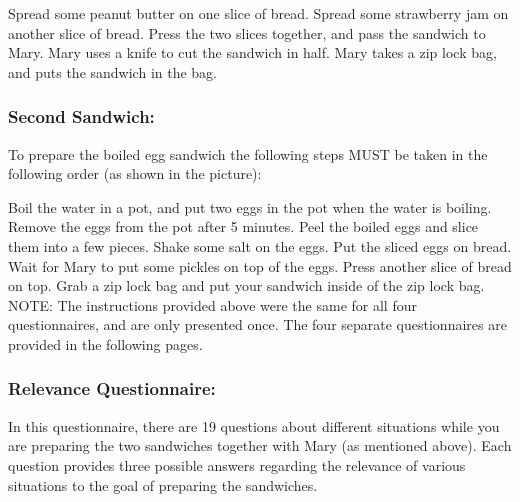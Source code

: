 \documentclass[12pt]{report}
\begin{document}
\begin{appendices}
Spread some peanut butter on one slice of bread. Spread some strawberry jam on
another slice of bread.  Press the two slices together, and pass the sandwich to
Mary. Mary uses a knife to cut the sandwich in half. Mary takes a zip lock bag,
and puts the sandwich in the bag.

\subsubsection{Second Sandwich:}
To prepare the boiled egg sandwich the following steps MUST be taken in the
following order (as shown in the picture):

Boil the water in a pot, and put two eggs in the pot when the water is boiling.
Remove the eggs from the pot after 5 minutes. Peel the boiled eggs and slice
them into a few pieces. Shake some salt on the eggs. Put the sliced eggs on
bread. Wait for Mary to put some pickles on top of the eggs. Press another slice
of bread on top. Grab a zip lock bag and put your sandwich inside of the zip
lock bag.\\

\noindent NOTE: The instructions provided above were the same for all four
questionnaires, and are only presented once. The four separate questionnaires
are provided in the following pages. 
\pagebreak


\subsubsection{Relevance Questionnaire:}
In this questionnaire, there are 19 questions about different situations while
you are preparing the two sandwiches together with Mary (as mentioned above).
Each question provides three possible answers regarding the relevance of various
situations to the goal of preparing the sandwiches.



\end{appendices}
\end{document}
